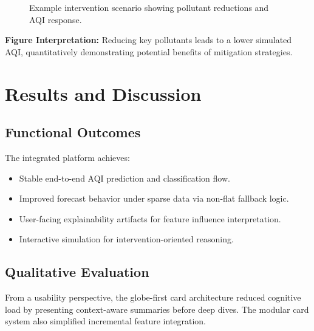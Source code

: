 \documentclass[12pt,a4paper]{article}
\begin{document}
\begin{figure}[H]
\centering
{}
\caption{Example intervention scenario showing pollutant reductions and AQI response.}
\label{fig:sim-output}
\end{figure}

\noindent\textbf{Figure Interpretation:} Reducing key pollutants leads to a lower simulated AQI, quantitatively demonstrating potential benefits of mitigation strategies.

\section{Results and Discussion}
\subsection{Functional Outcomes}
The integrated platform achieves:
\begin{itemize}[leftmargin=*]
    \item Stable end-to-end AQI prediction and classification flow.
    \item Improved forecast behavior under sparse data via non-flat fallback logic.
    \item User-facing explainability artifacts for feature influence interpretation.
    \item Interactive simulation for intervention-oriented reasoning.
\end{itemize}

\subsection{Qualitative Evaluation}
From a usability perspective, the globe-first card architecture reduced cognitive load by presenting context-aware summaries before deep dives. The modular card system also simplified incremental feature integration.
\end{document}
